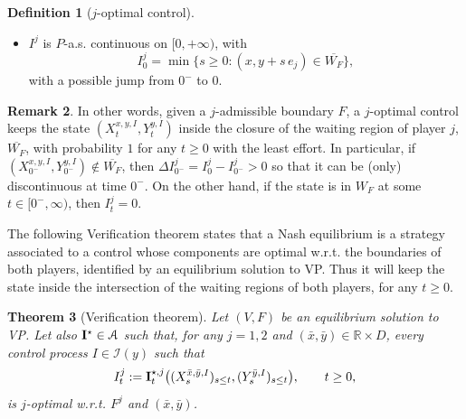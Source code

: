 \documentclass[10pt]{article}
\numberwithin{equation}{section}
\theoremstyle{plain}
\newtheorem{theorem}{Theorem}
\numberwithin{theorem}{section}
\theoremstyle{definition}
\newtheorem{definition}[theorem]{Definition}
\newtheorem{remark}[theorem]{Remark}
\def \R {\mathbb{R}}
\newcommand{\<}{\langle}
\renewcommand{\>}{\rangle}
\renewcommand{\(}{\left(}
\renewcommand{\)}{\right)}
\newcommand\contr{{\bf I}}
\def \R  {{\mathbb {R}}}
\def \R {{\mathbb {R}}}
\begin{document}
{{{\begin{definition}[$j$-optimal control]
\begin{itemize}
\begin{align}
\end{align}
\item[(ii)] $I^j$ is {$P$-a.s.} continuous {on $[0,+\infty)$}, with
\begin{equation}\label{eq:cond_c_i_optimal}
I^j_0 = \min\{ s\geq 0 : (x,y+s \, e_j)  \in \overline{W_F} \},
\end{equation}
with a possible jump from $0^-$ to $0$.
\end{itemize}
\end{definition}
\begin{remark}In other words, given a $j$-admissible boundary $F$, a $j$-optimal control keeps the state $(X^{x,y,I}_t,Y^{y,I}_t)$ inside the closure of the waiting region of player $j$, $\overline{W_F}$, with probability $1$ for any $t\geq 0$ with the least effort. In particular, if $(X^{x,y,I}_{0^-},Y^{y,I}_{0^-})\notin \overline{W_F}$, then $\Delta I^j_{0^-}=I^j_0-I^j_{0^-}>0$ so that it can be (only) discontinuous at time $0^-$. On the other hand, if the state is in $W_F$ at some $t\in [0^-,\infty)$, then $I^j_t=0$.
\end{remark}
The following Verification theorem states that a Nash equilibrium is a strategy associated to a control whose components are optimal w.r.t. the boundaries of both players, identified by an equilibrium solution to VP. Thus it will keep the state inside the intersection of the waiting regions of both players, for any $t\geq 0$.

\begin{theorem}[Verification theorem]\label{th:verific_th}
Let $(V,F)$ be an equilibrium solution to VP. Let also $\contr^{\star}\in\mathcal{A}$ such that, for any $j=1,2$ %
 and $(\bar{x},\bar{y})\in \R\times {D}$, every control process $I\in\mathcal{I}(y)$ such that 
\begin{equation}\label{eq:cond_Iit}
I^j_t := \contr_t^{\star,j}\big((X^{\bar x,\bar y,I}_s)_{s\leq t}, (Y^{\bar y,I}_{s} )_{s\leq t}\big), \qquad t\geq 0, 
\end{equation}
is $j$-optimal w.r.t. ${F^j}$ and $(\bar{x},\bar{y})$.


\end{theorem}}}}
\end{document}
